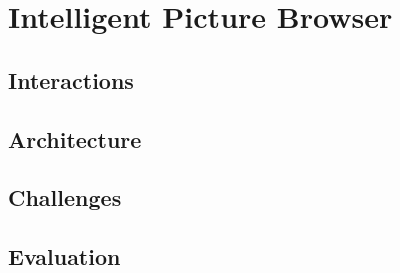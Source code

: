 \documentclass[11pt,a4paper]{article}
\begin{document}






\section{Intelligent Picture Browser}




\subsection{Interactions}


\subsection{Architecture}




\subsection{Challenges}






\subsection{Evaluation}




\end{document}
